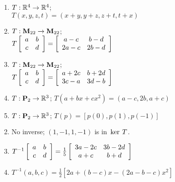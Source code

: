 \begin{multicols}{2}
\begin{ex}
\begin{enumerate}[label={\alph*.}]
\item $T : \mathbb{R}^4 \to \mathbb{R}^4$; \\ $T(x, y, z, t) = (x + y, y + z, z + t, t + x)$

\item $T : \textbf{M}_{22} \to \textbf{M}_{22}$; \\ $T\left[ \begin{array}{cc}
a & b \\
c & d
\end{array} \right] = \left[ \begin{array}{cc}
a - c & b - d \\
2a - c & 2b - d
\end{array} \right]$

\item $T : \textbf{M}_{22} \to \textbf{M}_{22}$; \\ $T\left[ \begin{array}{cc}
a & b \\
c & d
\end{array} \right] = \left[ \begin{array}{cc}
a + 2c & b + 2d \\
3c - a & 3d - b
\end{array} \right]$

\item $T : \textbf{P}_{2} \to \mathbb{R}^3$; $T(a + bx + cx^{2}) = (a - c, 2b, a + c)$

\item $T : \textbf{P}_{2} \to \mathbb{R}^3$; $T(p) = \left[p(0), p(1), p(-1)\right]$

\end{enumerate}
\begin{sol}
\begin{enumerate}[label={\alph*.}]
\setcounter{enumi}{1}
\item  No inverse; $(1, -1, 1, -1)$ is in $\thinspace\operatorname{ker \medspace}T$.

\setcounter{enumi}{3}
\item $T^{-1}\left[ \begin{array}{cc}
a & b \\
c & d
\end{array} \right] = \tfrac{1}{5}\left[ \begin{array}{cc}
3a - 2c & 3b - 2d \\
a + c & b + d
\end{array} \right]$

\setcounter{enumi}{5}
\item $T^{-1}(a, b, c) = \frac{1}{2}\left[2a + (b - c)x - (2a - b - c)x^{2}\right]$


\end{enumerate}
\end{sol}
\end{ex}
\end{multicols}
